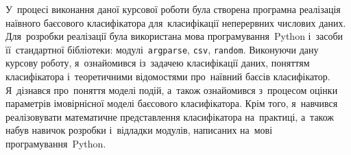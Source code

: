\documentclass[
	a4paper,
	oneside,
	DIV = 12,
	fontsize = 13pt,
	headings = normal,
	numbers = endperiod,
	bibliography = totoc, %
]{scrartcl}
\theoremstyle{mythm}
\newcommand{\modulename}[1]{\texttt{#1}}
\begin{document}
	\newpage

		У~процесі виконання даної курсової роботи була створена програмна реалізація наївного баєсового класифікатора для~класифікації неперервних числових даних. Для~розробки реалізації була використана мова програмування~\textenglish{Python} і~засоби її~стандартної бібліотеки: модулі~\modulename{argparse}, \modulename{csv}, \modulename{random}. Виконуючи дану курсову роботу, я~ознайомився із~задачею класифікації даних, поняттям класифікатора і~теоретичними відомостями про~наївний баєсів класифікатор. Я~дізнався про~поняття моделі подій, а~також ознайомився з~процесом оцінки параметрів імовірнісної моделі баєсового класифікатора. Крім того, я~навчився реалізовувати математичне представлення класифікатора на~практиці, а~також набув навичок розробки і~відладки модулів, написаних на~мові програмування~\textenglish{Python}.

	\newpage
	\printbibliography
\end{document}
